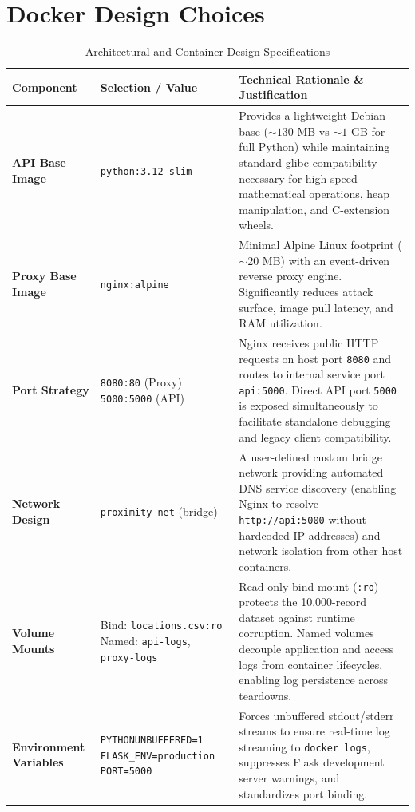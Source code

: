 \documentclass[11pt,a4paper]{article}
\begin{document}
\section{Docker Design Choices}

\begin{table}[H]
\centering
\small
\caption{Architectural and Container Design Specifications}
\label{tab:design_choices}
\begin{tabularx}{\textwidth}{@{}l p{3.8cm} p{8.2cm}@{}}
\toprule
\textbf{Component} & \textbf{Selection / Value} & \textbf{Technical Rationale \& Justification} \\ \midrule
\textbf{API Base Image} & \texttt{python:3.12-slim} & Provides a lightweight Debian base ($\sim 130$ MB vs $\sim 1$ GB for full Python) while maintaining standard glibc compatibility necessary for high-speed mathematical operations, heap manipulation, and C-extension wheels. \\
\textbf{Proxy Base Image} & \texttt{nginx:alpine} & Minimal Alpine Linux footprint ($\sim 20$ MB) with an event-driven reverse proxy engine. Significantly reduces attack surface, image pull latency, and RAM utilization. \\
\textbf{Port Strategy} & \texttt{8080:80} (Proxy) \newline \texttt{5000:5000} (API) & Nginx receives public HTTP requests on host port \texttt{8080} and routes to internal service port \texttt{api:5000}. Direct API port \texttt{5000} is exposed simultaneously to facilitate standalone debugging and legacy client compatibility. \\
\textbf{Network Design} & \texttt{proximity-net} (bridge) & A user-defined custom bridge network providing automated DNS service discovery (enabling Nginx to resolve \texttt{http://api:5000} without hardcoded IP addresses) and network isolation from other host containers. \\
\textbf{Volume Mounts} & Bind: \texttt{locations.csv:ro} \newline Named: \texttt{api-logs}, \texttt{proxy-logs} & Read-only bind mount (\texttt{:ro}) protects the 10,000-record dataset against runtime corruption. Named volumes decouple application and access logs from container lifecycles, enabling log persistence across teardowns. \\
\textbf{Environment Variables} & \texttt{PYTHONUNBUFFERED=1} \newline \texttt{FLASK\_ENV=production} \newline \texttt{PORT=5000} & Forces unbuffered stdout/stderr streams to ensure real-time log streaming to \texttt{docker logs}, suppresses Flask development server warnings, and standardizes port binding. \\

\end{tabularx}
\end{table}
\end{document}
